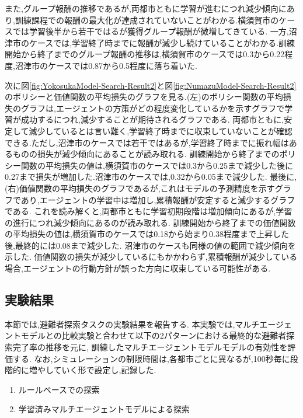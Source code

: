 また,グループ報酬の推移であるが,両都市ともに学習が進むにつれ減少傾向にあり,訓練課程での報酬の最大化が達成されていないことがわかる.横須賀市のケースでは学習後半から若干ではるが獲得グループ報酬が微増してきている.
一方,沼津市のケースでは,学習終了時までに報酬が減少し続けていることがわかる.訓練開始から終了までのグループ報酬の推移は,横須賀市のケースでは0.3から0.22程度,沼津市のケースでは0.87から0.5程度に落ち着いた.\par 
次に図\ref{fig:YokosukaModel-Search-Result2}と図\ref{fig:NumazuModel-Search-Result2}のポリシーと価値関数の平均損失のグラフを見る.(左)のポリシー関数の平均損失のグラフは,エージェントの方策がどの程度変化しているかを示すグラフで学習が成功するにつれ,減少することが期待されるグラフである.
両都市ともに,安定して減少しているとは言い難く,学習終了時までに収束していないことが確認できる.ただし,沼津市のケースでは若干ではあるが,学習終了時までに振れ幅はあるものの損失が減少傾向にあることが読み取れる.
訓練開始から終了までのポリシー関数の平均損失の値は,横須賀市のケースでは0.3から0.25まで減少した後に0.27まで損失が増加した.沼津市のケースでは,0.32から0.05まで減少した.
最後に,(右)価値関数の平均損失のグラフであるが,これはモデルの予測精度を示すグラフであり,エージェントの学習中は増加し,累積報酬が安定すると減少するグラフである.
これを読み解くと,両都市ともに学習初期段階は増加傾向にあるが,学習の進行につれ減少傾向にあるのが読み取れる.
訓練開始から終了までの価値関数の平均損失の値は,横須賀市のケースでは0.18から始まり0.38程度まで上昇した後,最終的には0.08まで減少した.
沼津市のケースも同様の値の範囲で減少傾向を示した.
価値関数の損失が減少しているにもかかわらず,累積報酬が減少している場合,エージェントの行動方針が誤った方向に収束している可能性がある.

\subsection{実験結果}
本節では,避難者探索タスクの実験結果を報告する.
本実験では,マルチエージェントモデルとの比較実験と合わせて以下の2パターンにおける最終的な避難者探索完了率の推移を元に,
訓練したマルチエージェントモデルモデルの有効性を評価する.
なお,シミュレーションの制限時間は,各都市ごとに異なるが,100秒毎に段階的に増やしていく形で設定し,記録した.
\begin{enumerate}
  \item ルールベースでの探索
  \item 学習済みマルチエージェントモデルによる探索
\end{enumerate}

